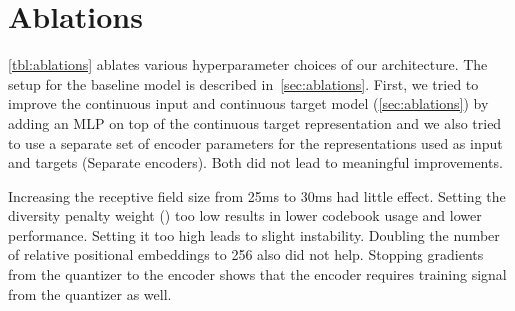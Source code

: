 \documentclass{article}
\begin{document}
\newpage
\section{Ablations}
\label{app:ablations}

\autoref{tbl:ablations} ablates various hyperparameter choices of our architecture. The setup for the baseline model is described in~\autoref{sec:ablations}. 
First, we tried to improve the continuous input and continuous target model (\autoref{sec:ablations}) by adding an MLP on top of the continuous target representation and we also tried to use a separate set of encoder parameters for the representations used as input and targets (Separate encoders). 
Both did not lead to meaningful improvements.

Increasing the receptive field size from 25ms to 30ms had little effect.
Setting the diversity penalty weight () too low results in lower codebook usage and lower performance.
Setting it too high leads to slight instability.
Doubling the number of relative positional embeddings to 256 also did not help.
Stopping gradients from the quantizer to the encoder shows that the encoder requires training signal from the quantizer as well.
\end{document}
